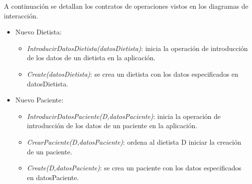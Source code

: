 A continuación se detallan los contratos de operaciones vistos en los diagramas de interacción.
\begin{itemize}
\item Nuevo Dietista:
\begin{itemize}
\item \textit{IntroducirDatosDietista(datosDietista)}: inicia la operación de introducción de los datos de un dietista en la aplicación.
\item \textit{Create(datosDietista)}: se crea un dietista con los datos especificados en datosDietista.
\end{itemize}
\item Nuevo Paciente:
\begin{itemize}
\item \textit{IntroducirDatosPaciente(D,datosPaciente)}: inicia la operación de introducción de los datos de un paciente en la aplicación.
\item \textit{CrearPaciente(D,datosPaciente)}: ordena al dietista D iniciar la creación de un paciente.
\item \textit{Create(D,datosPaciente)}: se crea un paciente con los datos especificados en datosPaciente.
\end{itemize}
\end{itemize}
\newpage



